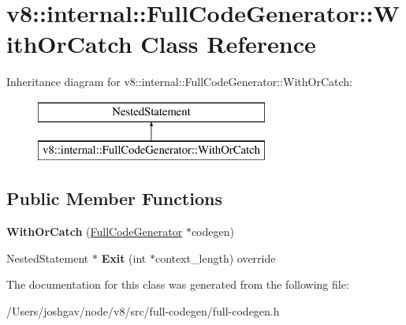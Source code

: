 \hypertarget{classv8_1_1internal_1_1_full_code_generator_1_1_with_or_catch}{}\section{v8\+:\+:internal\+:\+:Full\+Code\+Generator\+:\+:With\+Or\+Catch Class Reference}
\label{classv8_1_1internal_1_1_full_code_generator_1_1_with_or_catch}
Inheritance diagram for v8\+:\+:internal\+:\+:Full\+Code\+Generator\+:\+:With\+Or\+Catch\+:\begin{figure}[H]
\begin{center}
\leavevmode
\includegraphics[height=2.000000cm]{classv8_1_1internal_1_1_full_code_generator_1_1_with_or_catch}
\end{center}
\end{figure}
\subsection*{Public Member Functions}
\begin{DoxyCompactItemize}
\item 
{\bfseries With\+Or\+Catch} (\hyperlink{classv8_1_1internal_1_1_full_code_generator}{Full\+Code\+Generator} $\ast$codegen)\hypertarget{classv8_1_1internal_1_1_full_code_generator_1_1_with_or_catch_a2dcf813a5c70408c0dcb0fa9f8319d7b}{}\label{classv8_1_1internal_1_1_full_code_generator_1_1_with_or_catch_a2dcf813a5c70408c0dcb0fa9f8319d7b}

\item 
Nested\+Statement $\ast$ {\bfseries Exit} (int $\ast$context\+\_\+length) override\hypertarget{classv8_1_1internal_1_1_full_code_generator_1_1_with_or_catch_a7720159731012f1d467225adbe525e1c}{}\label{classv8_1_1internal_1_1_full_code_generator_1_1_with_or_catch_a7720159731012f1d467225adbe525e1c}

\end{DoxyCompactItemize}


The documentation for this class was generated from the following file\+:\begin{DoxyCompactItemize}
\item 
/\+Users/joshgav/node/v8/src/full-\/codegen/full-\/codegen.\+h\end{DoxyCompactItemize}
